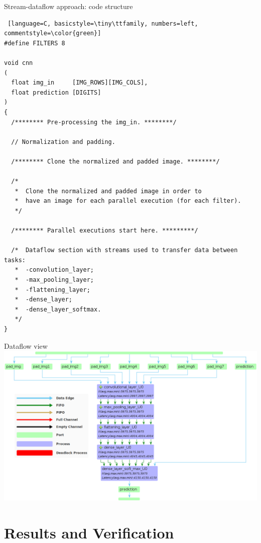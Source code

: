 \documentclass[xcolor=table]{beamer}
\begin{document}
\begin{frame}[fragile]{Stream-dataflow approach: code structure}
  \begin{lstlisting} [language=C, basicstyle=\tiny\ttfamily, numbers=left, commentstyle=\color{green}]
#define FILTERS 8

void cnn
(
  float img_in     [IMG_ROWS][IMG_COLS],
  float prediction [DIGITS]
)
{
  /******** Pre-processing the img_in. ********/

  // Normalization and padding.

  /******** Clone the normalized and padded image. ********/

  /*
   *  Clone the normalized and padded image in order to
   *  have an image for each parallel execution (for each filter).
   */

  /******** Parallel executions start here. *********/

  /*  Dataflow section with streams used to transfer data between tasks:
   *  -convolution_layer;
   *  -max_pooling_layer;
   *  -flattening_layer;
   *  -dense_layer;
   *  -dense_layer_softmax.
   */
}
  \end{lstlisting}
\end{frame}

\begin{frame}{Dataflow view}
  \centering
  \includegraphics[scale=0.29]{Images/dataflow-and-legend.png}
\end{frame}

\section{Results and Verification}

\end{document}
